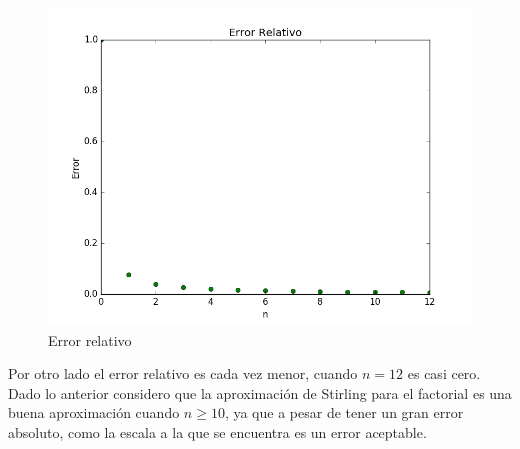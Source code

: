 \documentclass{article}
\begin{document}
\begin{figure}[h!]
\centering
\includegraphics[scale=0.5]{Error_relativo.png}
\caption{Error relativo}
\end{figure}
Por otro lado el error relativo es cada vez menor, cuando $n =12$ es casi cero.\\

Dado lo anterior considero que la aproximación de Stirling para el factorial es una buena aproximación cuando $n\geq 10$, ya que a pesar de tener un gran error absoluto, como la escala a la que se encuentra es un error aceptable.
\end{document}
